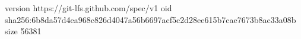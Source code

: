 version https://git-lfs.github.com/spec/v1
oid sha256:6b8da57d4ea968c826d4047a56b6697acf5c2d28ee615b7cae7673b8ac33a08b
size 56381
